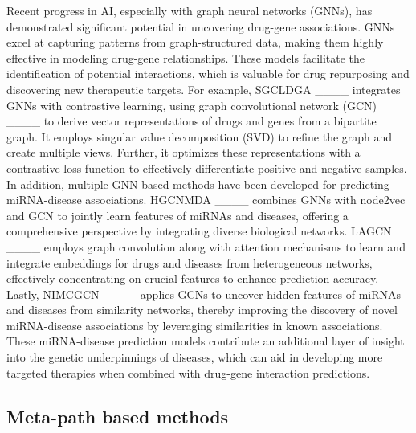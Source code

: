 Recent progress in AI, especially with graph neural networks (GNNs), has demonstrated significant potential in uncovering drug-gene associations. GNNs excel at capturing patterns from graph-structured data, making them highly effective in modeling drug-gene relationships. These models facilitate the identification of potential interactions, which is valuable for drug repurposing and discovering new therapeutic targets. For example, SGCLDGA ____ integrates GNNs with contrastive learning, using graph convolutional network (GCN)  ____ to derive vector representations of drugs and genes from a bipartite graph. It employs singular value decomposition (SVD) to refine the graph and create multiple views. Further, it optimizes these representations with a contrastive loss function to effectively differentiate positive and negative samples. In addition, multiple GNN-based methods have been developed for predicting miRNA-disease associations. HGCNMDA ____ combines GNNs with node2vec and GCN to jointly learn features of miRNAs and diseases, offering a comprehensive perspective by integrating diverse biological networks. LAGCN ____ employs graph convolution along with attention mechanisms to learn and integrate embeddings for drugs and diseases from heterogeneous networks, effectively concentrating on crucial features to enhance prediction accuracy. Lastly, NIMCGCN ____ applies GCNs to uncover hidden features of miRNAs and diseases from similarity networks, thereby improving the discovery of novel miRNA-disease associations by leveraging similarities in known associations. These miRNA-disease prediction models contribute an additional layer of insight into the genetic underpinnings of diseases, which can aid in developing more targeted therapies when combined with drug-gene interaction predictions.

\subsection{Meta-path based methods}

